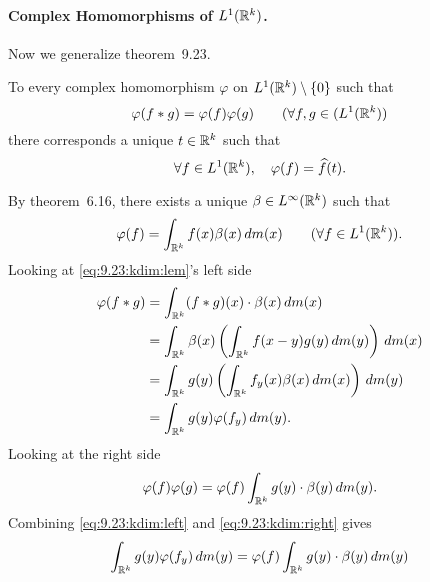 \begin{enumerate}
\paragraph{Complex Homomorphisms of \(L^1(\mathbb{R}^k)\).}
Now we generalize theorem~9.23.
\begin{llem}
To every complex homomorphism \(\varphi\) on \(L^1(\mathbb{R}^k)\setminus\{0\}\)
such that
\begin{equation} \label{eq:9.23:kdim:lem}
\varphi(f\ast g) = \varphi(f)\varphi(g) \qquad (\forall f,g\in(L^1(\mathbb{R}^k))
\end{equation}
there corresponds a unique \(t\in\mathbb{R}^k\) such that
\begin{equation} \label{eq:9.23:kdim:beta}
\forall f\in L^1(\mathbb{R}^k),\quad  \varphi(f) = \widehat{f}(t).
\end{equation}
\end{llem}
\begin{thmproof}
By theorem~6.16, there exists a unique
\(\beta \in L^\infty(\mathbb{R}^k)\) such that 
\begin{equation} \label{eq:9.23:kdim:eu:beta}
\varphi(f) = \int_{\mathbb{R}^k} f(x)\beta(x)\,dm(x) \qquad (\forall f\in L^1(\mathbb{R}^k)).
\end{equation}
Looking at \eqref{eq:9.23:kdim:lem}'s left side
\begin{align}
\varphi(f \ast g)
&= \int_{\mathbb{R}^k} (f\ast g)(x)\cdot\beta(x)\,dm(x) \notag \\
&= \int_{\mathbb{R}^k} \beta(x)
     \left(\int_{\mathbb{R}^k} f(x-y)g(y)\,dm(y)\right)\,dm(x) \notag \\
&= \int_{\mathbb{R}^k} g(y)
     \left(\int_{\mathbb{R}^k} f_y(x)\beta(x)\,dm(x)\right)\,dm(y) \notag \\
&= \int_{\mathbb{R}^k} g(y)\varphi(f_y)\,dm(y). \label{eq:9.23:kdim:left}
\end{align}
Looking at the right side
\begin{equation}  \label{eq:9.23:kdim:right}
\varphi(f)\varphi(g) = \varphi(f)\int_{\mathbb{R}^k} g(y)\cdot\beta(y)\,dm(y).
\end{equation}
Combining
\eqref{eq:9.23:kdim:left} and
\eqref{eq:9.23:kdim:right} gives
\begin{equation} \label{eq:9.23:kdim:lr}
\int_{\mathbb{R}^k} g(y)\varphi(f_y)\,dm(y) 
= \varphi(f)\int_{\mathbb{R}^k} g(y)\cdot\beta(y)\,dm(y)
\end{equation}


\end{thmproof}
\end{enumerate}

